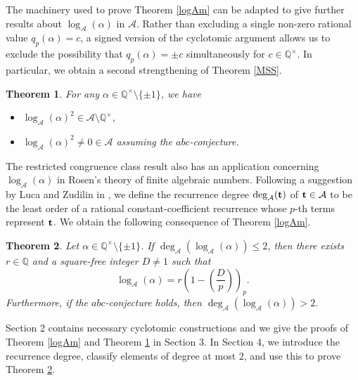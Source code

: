 \documentclass[10pt,a4paper]{amsart}
\newtheorem{theorem}{Theorem}[section]
\newcommand{\cA}{\mathcal A}
\newcommand{\leg}[2]{\left(\frac{#1}{#2}\right)}
\begin{document}
The machinery used to prove Theorem \ref{logAm} can be adapted to give further results about $\log_\cA(\alpha)$ in $\cA$. 
Rather than excluding a single non-zero rational value $q_p(\alpha)=c$, a signed version of the cyclotomic argument allows us to exclude the possibility that $q_p(\alpha)=\pm c$ simultaneously for $c\in\mathbb{Q}^\times$. 
In particular, we obtain a second strengthening of Theorem \ref{MSS}.
\begin{theorem}\label{logsquare}
For any $\alpha\in\mathbb{Q}^\times\setminus\{\pm 1\}$, we have 
\begin{itemize}
\item[(i)]
$\log_\cA(\alpha)^2\in\cA\setminus\mathbb{Q}^{\times}$, 
\item[(ii)]
$\log_\cA(\alpha)^2\neq 0\in\cA$ assuming the $abc$-conjecture.
\end{itemize}
\end{theorem}

The restricted congruence class result also has an application concerning $\log_\cA(\alpha)$ in Rosen's theory of finite algebraic numbers. Following a suggestion by Luca and Zudilin in \cite{LZ25}, we define the recurrence degree $\deg_\cA({\bf t})$ of ${\bf t}\in\cA$ to be the least order of a rational constant-coefficient recurrence whose $p$-th terms represent ${\bf t}$. We obtain the following consequence of Theorem \ref{logAm}.
\begin{theorem}\label{degtwo}
Let $\alpha\in\mathbb{Q}^\times\setminus\{\pm 1\}$. If $\deg_\cA(\log_\cA(\alpha))\leq 2$, 
then there exists $r\in\mathbb{Q}$ and a square-free integer $D\neq 1$ such that
\[\log_\cA(\alpha)=r\left(1-\leg{D}{p}\right)_p.\]
Furthermore, if the $abc$-conjecture holds, then $\deg_\cA(\log_\cA(\alpha))>2$. 
\end{theorem}
Section 2 contains necessary cyclotomic constructions and we give the proofs of Theorem \ref{logAm} and Theorem \ref{logsquare} in Section 3. In Section 4, we introduce the recurrence degree, classify elements of degree at most 2, and use this to prove Theorem \ref{degtwo}. 


 
\end{document}
